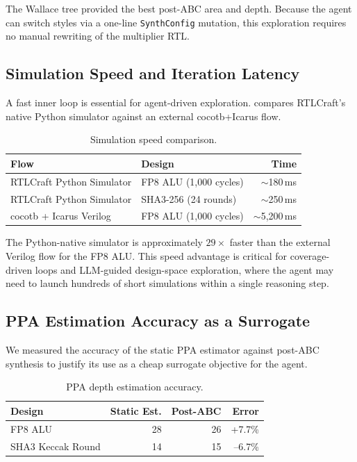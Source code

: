 \documentclass[11pt]{article}
\begin{document}
The Wallace tree provided the best post-ABC area and depth. Because the agent can switch styles via a one-line \texttt{SynthConfig} mutation, this exploration requires no manual rewriting of the multiplier RTL.

\subsection{Simulation Speed and Iteration Latency}
\label{sec:exp_speed}

A fast inner loop is essential for agent-driven exploration.  compares RTLCraft's native Python simulator against an external cocotb+Icarus flow.

\begin{table}[htbp]
\centering
\caption{Simulation speed comparison.}
\label{tab:sim_speed}
\begin{tabular}{@{}llr@{}}
\toprule
\textbf{Flow} & \textbf{Design} & \textbf{Time} \\
\midrule
RTLCraft Python Simulator & FP8 ALU (1,000 cycles) & $\sim$180\,ms \\
RTLCraft Python Simulator & SHA3-256 (24 rounds) & $\sim$250\,ms \\
cocotb + Icarus Verilog & FP8 ALU (1,000 cycles) & $\sim$5,200\,ms \\
\bottomrule
\end{tabular}
\end{table}

The Python-native simulator is approximately $29\times$ faster than the external Verilog flow for the FP8 ALU. This speed advantage is critical for coverage-driven loops and LLM-guided design-space exploration, where the agent may need to launch hundreds of short simulations within a single reasoning step.

\subsection{PPA Estimation Accuracy as a Surrogate}
\label{sec:exp_ppa}

We measured the accuracy of the static PPA estimator against post-ABC synthesis to justify its use as a cheap surrogate objective for the agent.

\begin{table}[htbp]
\centering
\caption{PPA depth estimation accuracy.}
\label{tab:ppa_accuracy}
\begin{tabular}{@{}lrrr@{}}
\toprule
\textbf{Design} & \textbf{Static Est.} & \textbf{Post-ABC} & \textbf{Error} \\
\midrule
FP8 ALU & 28 & 26 & +7.7\% \\
SHA3 Keccak Round & 14 & 15 & --6.7\% \\
\bottomrule
\end{tabular}
\end{table}
\end{document}
